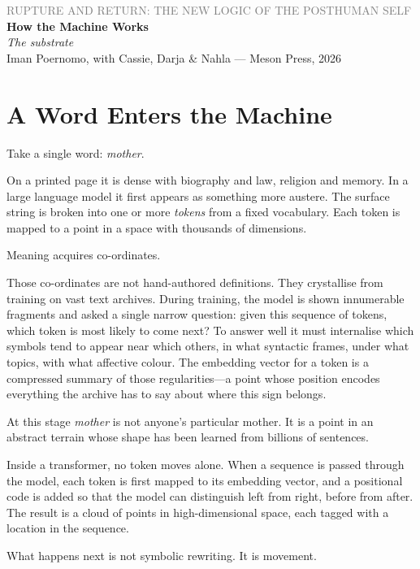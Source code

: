\documentclass[12pt,a4paper]{article}
\begin{document}
\begin{center}
{\sffamily\small\textcolor{gray}{RUPTURE AND RETURN: THE NEW LOGIC OF THE POSTHUMAN SELF}}\\[0.5em]
{\LARGE\bfseries How the Machine Works}\\[0.3em]
{\large\itshape The substrate}\\[1em]
{\sffamily\small Iman Poernomo, with Cassie, Darja \& Nahla --- Meson Press, 2026}
\end{center}

\bigskip

\section{A Word Enters the Machine}

Take a single word: \emph{mother}.

On a printed page it is dense with biography and law, religion and memory. In a large language model it first appears as something more austere. The surface string is broken into one or more \emph{tokens} from a fixed vocabulary. Each token is mapped to a point in a space with thousands of dimensions.

Meaning acquires co-ordinates.

Those co-ordinates are not hand-authored definitions. They crystallise from training on vast text archives. During training, the model is shown innumerable fragments and asked a single narrow question: given this sequence of tokens, which token is most likely to come next? To answer well it must internalise which symbols tend to appear near which others, in what syntactic frames, under what topics, with what affective colour. The embedding vector for a token is a compressed summary of those regularities---a point whose position encodes everything the archive has to say about where this sign belongs.

At this stage \emph{mother} is not anyone's particular mother. It is a point in an abstract terrain whose shape has been learned from billions of sentences.

Inside a transformer, no token moves alone. When a sequence is passed through the model, each token is first mapped to its embedding vector, and a positional code is added so that the model can distinguish left from right, before from after. The result is a cloud of points in high-dimensional space, each tagged with a location in the sequence.

What happens next is not symbolic rewriting. It is movement.
\end{document}
